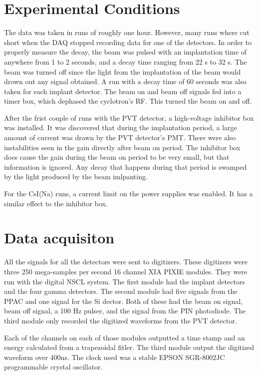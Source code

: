 \section{Experimental Conditions}
The data was taken in runs of roughly one hour. 
However, many runs where cut short when the DAQ stopped recording data for one of the detectors.
In order to properly measure the decay, the beam was pulsed with an implantation time of anywhere from 1 to 2 seconds, and a decay time ranging from 22 s to 32 s. 
The beam was turned off since the light from the implantation of the beam would drown out any signal obtained. 
A run with a decay time of 60 seconds was also taken for each implant detector. 
The beam on and beam off signals fed into a timer box, which dephased the cyclotron's RF.
This turned the beam on and off. 

After the frist couple of runs with the PVT detector, a high-voltage inhibitor box was installed.
It was discovered that during the implantation period, a large amount of current was drawn by the PVT detector's PMT. 
There were also instabilities seen in the gain directly after beam on period.
The inhibitor box does cause the gain during the beam on period to be very small, but that information is ignored.
Any decay that happens during that period is swamped by the light produced by the beam imlpanting.

For the CsI(Na) runs, a current limit on the power supplies was enabled.
It has a similar effect to the inhibitor box. 

\section{Data acquisiton}

All the signals for all the detectors were sent to digitizers.
These digitizers were three 250 mega-samples per second 16 channel XIA PIXIE modules. 
They were run with the digital NSCL system.
The first module had the implant detectors and the four gamma detectors. 
The second module had five signals from the PPAC and one signal for the Si dector. 
Both of these had the beam on signal, beam off signal, a 100 Hz pulser, and the signal from the PIN photodiode. 
The third module only recorded the digitized waveforms from the PVT detector.

Each of the channels on each of those modules outputted a time stamp and an energy calculated from a trapezoidal fitler.
The third module output the digitized waveform over 400ns.
The clock used was a stable EPSON SGR-8002JC programmable crystal oscillator.

